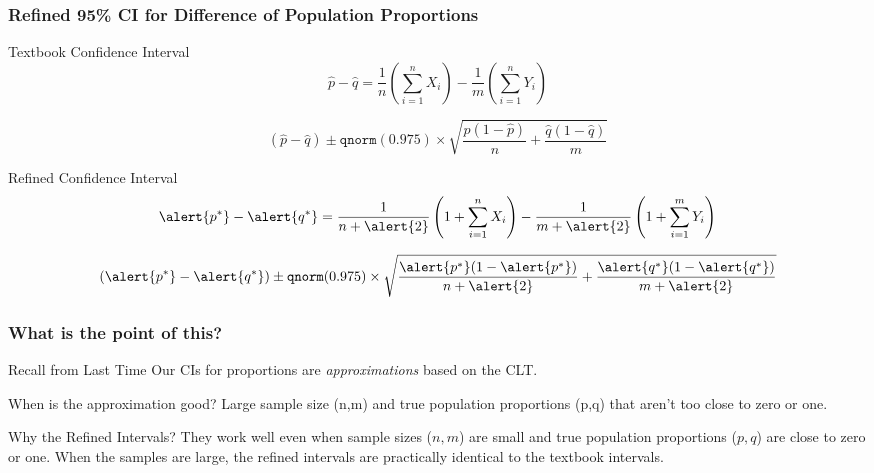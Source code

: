\begin{frame}
\frametitle{Refined 95\% CI for Difference of Population Proportions}
\small
\alert{}

\begin{block}{Textbook Confidence Interval}
$$\widehat{p} - \widehat{q} = \frac{1}{n}\left(\sum_{i=1}^n X_i\right) - \frac{1}{m}\left(\sum_{i=1}^n Y_i\right)$$

	$$\left(\widehat{p} -\widehat{q}\right)\pm \texttt{qnorm}(0.975) \times \sqrt{\frac{\widehat{p}(1-\widehat{p})}{n} + \frac{\widehat{q}(1-\widehat{q})}{m}}$$

\end{block}


\begin{block}{Refined Confidence Interval}
	$$\alert{p^*} - \alert{q^*} = \frac{1}{n+\alert{2}}\left(1 + \sum_{i=1}^n X_i\right) - \frac{1}{m+\alert{2}}\left(1 + \sum_{i=1}^m Y_i\right) $$

	$$\left(\alert{p^*} -\alert{q^*}\right)\pm \texttt{qnorm}(0.975) \times \sqrt{\frac{\alert{p^*}(1-\alert{p^*})}{n+\alert{2}} + \frac{\alert{q^*}(1-\alert{q^*})}{m+\alert{2}}}$$
\end{block}

\end{frame}
\begin{frame}
\frametitle{What is the point of this?}

\begin{block}{Recall from Last Time}
Our CIs for proportions are \emph{approximations} based on the CLT. 
\end{block}

\begin{block}{When is the approximation good?} 
Large sample size (n,m) and true population proportions (p,q) that aren't too close to zero or one. 
\end{block}


\begin{alertblock}{Why the Refined Intervals?}
They work well even when sample sizes ($n,m$) are small and true population proportions ($p,q$) are close to zero or one. When the samples are large, the refined intervals are practically identical to the textbook intervals. 
\end{alertblock}
\end{frame}
